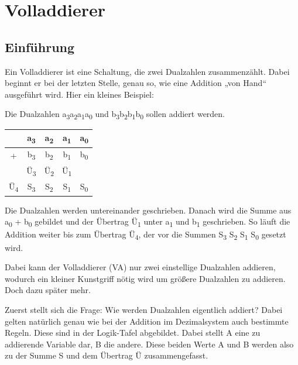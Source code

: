 \chapter{Volladdierer}

\section{Einführung}

Ein Volladdierer ist eine Schaltung, die zwei Dualzahlen zusammenzählt. Dabei beginnt er bei der letzten Stelle, genau so, wie eine Addition „von Hand“ ausgeführt wird. Hier ein kleines Beispiel:

Die Dualzahlen a\textsubscript{3}a\textsubscript{2}a\textsubscript{1}a\textsubscript{0} und b\textsubscript{3}b\textsubscript{2}b\textsubscript{1}b\textsubscript{0} sollen addiert werden.

\begin{table}[htbp]
  \centering
  \begin{tabular}{ccccc}
    \toprule
     & a\textsubscript{3} & a\textsubscript{2} & a\textsubscript{1} & a\textsubscript{0} \\
    \midrule
    + & b\textsubscript{3} & b\textsubscript{2} & b\textsubscript{1} & b\textsubscript{0} \\
     & Ü\textsubscript{3} & Ü\textsubscript{2} & Ü\textsubscript{1} &  \\
    Ü\textsubscript{4} & S\textsubscript{3} & S\textsubscript{2} & S\textsubscript{1} & S\textsubscript{0} \\
    \bottomrule
  \end{tabular}
\end{table}

Die Dualzahlen werden untereinander geschrieben. Danach wird die Summe aus a\textsubscript{0} + b\textsubscript{0} gebildet und der Übertrag Ü\textsubscript{1} unter a\textsubscript{1} und b\textsubscript{1} geschrieben. So läuft die Addition weiter bis zum Übertrag Ü\textsubscript{4}, der vor die Summen S\textsubscript{3} S\textsubscript{2} S\textsubscript{1} S\textsubscript{0} gesetzt wird.

Dabei kann der Volladdierer (VA) nur zwei einstellige Dualzahlen addieren, wodurch ein kleiner Kunstgriff nötig wird um größere Dualzahlen zu addieren. Doch dazu später mehr.

Zuerst stellt sich die Frage: Wie werden Dualzahlen eigentlich addiert? Dabei gelten natürlich genau wie bei der Addition im Dezimalsystem auch bestimmte Regeln. Diese sind in der Logik-Tafel abgebildet. Dabei stellt A eine zu addierende Variable dar, B die andere. Diese beiden Werte A und B werden also zu der Summe S und dem Übertrag Ü zusammengefasst.

